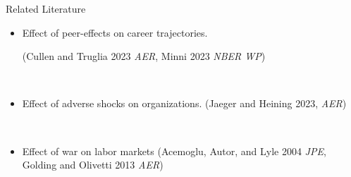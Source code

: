 \begin{frame}{Related Literature}
    \begin{itemize}
        \item Effect of peer-effects on career trajectories.

        (Cullen and Truglia 2023 \emph{AER}, Minni 2023 \emph{NBER WP})
        
        \
        
        \item Effect of adverse shocks on organizations.
        (Jaeger and Heining 2023, \emph{AER})

        \
        
        \item Effect of war on labor markets
        (Acemoglu, Autor, and Lyle 2004 \emph{JPE}, Golding and Olivetti 2013 \emph{AER})
        
    \end{itemize}
\end{frame}